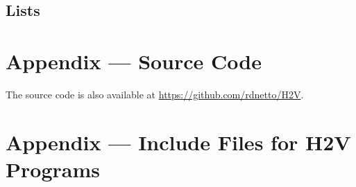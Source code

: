 \documentclass[english,onecolumn]{scrartcl}
\begin{document}
\subsection{Lists}




\section{Appendix --- Source Code}
The source code is also available at \url{https://github.com/rdnetto/H2V}.









\section{Appendix --- Include Files for H2V Programs}



\printbibliography
\end{document}
